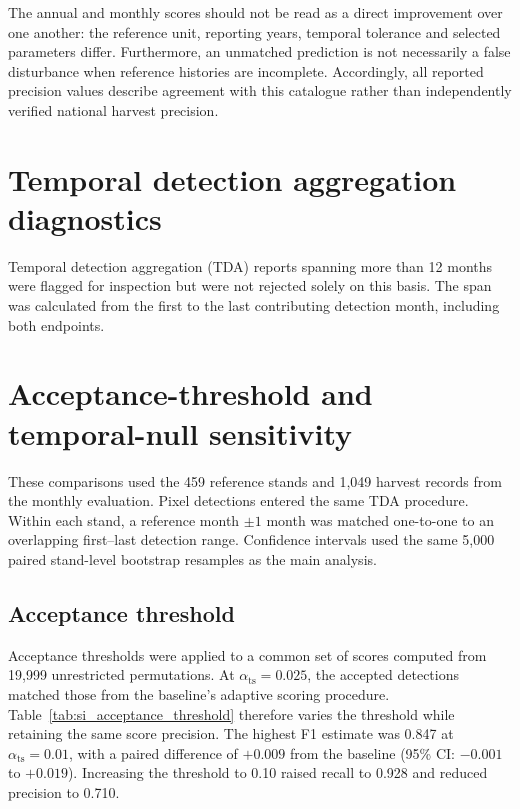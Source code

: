 \documentclass[11pt,a4paper]{article}
\begin{document}
The annual and monthly scores should not be read as a direct improvement over one another: the reference unit, reporting years, temporal tolerance and selected parameters differ. Furthermore, an unmatched prediction is not necessarily a false disturbance when reference histories are incomplete. Accordingly, all reported precision values describe agreement with this catalogue rather than independently verified national harvest precision.

\section{Temporal detection aggregation diagnostics}
\label{sec:si_tda_diagnostics}
Temporal detection aggregation (TDA) reports spanning more than 12 months were flagged for inspection but were not rejected solely on this basis. The span was calculated from the first to the last contributing detection month, including both endpoints.

\section{Acceptance-threshold and temporal-null sensitivity}
\label{sec:si_detector_sensitivity}

These comparisons used the 459 reference stands and 1,049 harvest records from the monthly evaluation. Pixel detections entered the same TDA procedure. Within each stand, a reference month $\pm1$ month was matched one-to-one to an overlapping first--last detection range. Confidence intervals used the same 5,000 paired stand-level bootstrap resamples as the main analysis.

\subsection{Acceptance threshold}

Acceptance thresholds were applied to a common set of scores computed from 19,999 unrestricted permutations. At $\alpha_{\mathrm{ts}}=0.025$, the accepted detections matched those from the baseline's adaptive scoring procedure. Table~\ref{tab:si_acceptance_threshold} therefore varies the threshold while retaining the same score precision. The highest F1 estimate was 0.847 at $\alpha_{\mathrm{ts}}=0.01$, with a paired difference of $+0.009$ from the baseline (95\% CI: $-0.001$ to $+0.019$). Increasing the threshold to 0.10 raised recall to 0.928 and reduced precision to 0.710.
\end{document}
